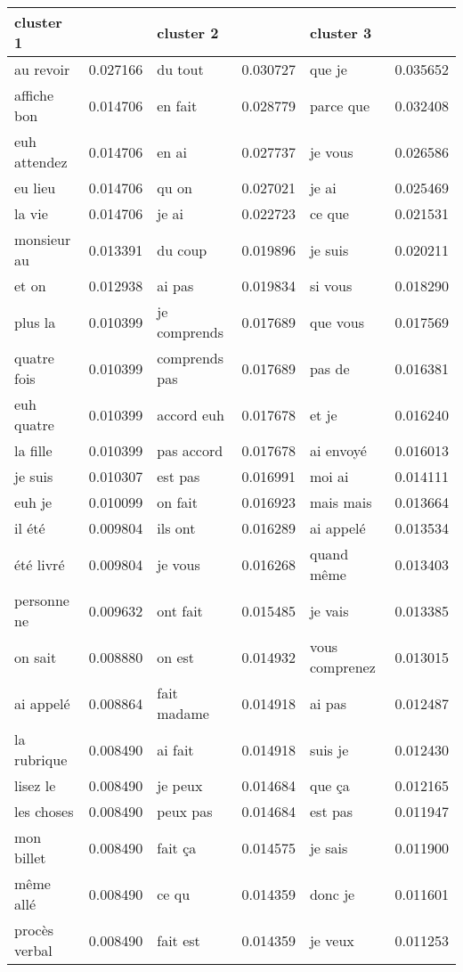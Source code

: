 \begin{table}[]
\centering
\begin{tabular}{|l l|l l|l l|}
 \hline
 cluster 1&&cluster 2 &&cluster 3 & \\
 \hline
 au revoir &0.027166	& du tout &0.030727	&que je &0.035652\\
 affiche bon &0.014706	& en fait &0.028779	& parce que &0.032408\\
euh attendez &0.014706	& en ai &0.027737	& je vous &0.026586\\
 eu lieu &0.014706	& qu on &0.027021	& je ai &0.025469\\
la vie &0.014706	& je ai &0.022723	&ce que &0.021531\\
 monsieur au &0.013391	& du coup &0.019896	& je suis &0.020211\\
 et on &0.012938	&ai pas &0.019834	& si vous &0.018290\\
 plus la &0.010399	&je comprends &0.017689	&que vous &0.017569\\
 quatre fois &0.010399	& comprends pas &0.017689	&pas de &0.016381\\
euh quatre &0.010399	&accord euh &0.017678	& et je &0.016240\\
la fille &0.010399	&pas accord &0.017678	& ai envoyé &0.016013\\
 je suis &0.010307	& est pas &0.016991	&moi ai &0.014111\\
euh je &0.010099	& on fait &0.016923	& mais mais &0.013664\\
il été &0.009804	& ils ont &0.016289	& ai appelé &0.013534\\
 été livré &0.009804	& je vous &0.016268	&quand même &0.013403\\
 personne ne &0.009632	&ont fait &0.015485	& je vais &0.013385\\
 on sait &0.008880	&on est &0.014932	&vous comprenez &0.013015\\
 ai appelé &0.008864	& fait madame &0.014918	&ai pas &0.012487\\
 la rubrique &0.008490	& ai fait &0.014918	& suis je &0.012430\\
lisez le &0.008490	& je peux &0.014684	&que ça &0.012165\\
les choses &0.008490	&peux pas &0.014684	& est pas &0.011947\\
mon billet &0.008490	& fait ça &0.014575	& je sais &0.011900\\
 même allé &0.008490	& ce qu &0.014359	& donc je &0.011601\\
 procès verbal &0.008490	&fait est &0.014359	& je veux &0.011253\\

\end{tabular}
\end{table}
